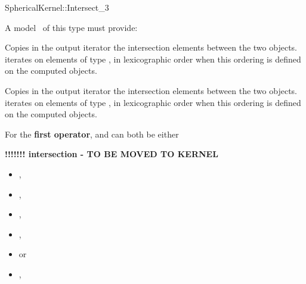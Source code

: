 \begin{ccRefFunctionObjectConcept}{SphericalKernel::Intersect_3}

\ccRefines



A model \ccVar\ of this type must provide:

{Copies in the output iterator the intersection elements between the
two objects.  iterates on
elements of type , in lexicographic order 
when this ordering is defined on the computed objects.}

{Copies in the output iterator the intersection elements between the
two objects.  iterates on
elements of type , in lexicographic order 
when this ordering is defined on the computed objects.}

For the \textbf{first operator},  and  can both 
be either

\textbf{!!!!!!! intersection -  TO BE MOVED TO KERNEL}

\begin{itemize}
\item {} ,
\item {} ,
\item {} ,
\item {} ,
\item {}  or
\item {} ,
\end{itemize} 


\end{ccRefFunctionObjectConcept}
